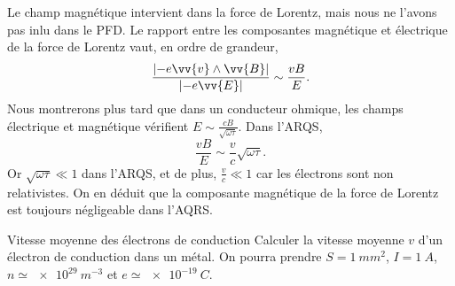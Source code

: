 \documentclass[12pt,fancy]{cours}%
\begin{document}
\label{subsec:effet_B}
Le champ magnétique intervient dans la force de Lorentz, mais nous ne l'avons pas inlu dans le PFD. Le rapport entre les composantes magnétique et électrique de la force de Lorentz vaut, en ordre de grandeur,
 \begin{equation}
 \frac{\norme{-e\vv{v}\pv\vv{B}}}{\norme{-e\vv{E}}}\sim\frac{vB}{E}.
 \end{equation}
Nous montrerons plus tard que dans un conducteur ohmique, les champs électrique et magnétique vérifient  $E\sim \frac{cB}{\sqrt{\omega\tau}}$.
Dans l'ARQS,
 \begin{equation}
   \frac{vB}{E}\sim \frac{v}{c}\sqrt{\omega\tau}.
   \end{equation}
   Or $\sqrt{\omega\tau}\ll 1$ dans l'ARQS, et de plus, $\frac{v}{c}\ll 1$ car les électrons sont non relativistes. On en déduit que la composante magnétique de la force de Lorentz est toujours négligeable dans l'AQRS.
   \begin{exemple}{Vitesse moyenne des électrons de conduction}
    Calculer la vitesse moyenne $v$ d'un électron de conduction dans un métal. On pourra prendre $S=\SI{1}{mm^2}$, $I=\SI{1}{A}$, $n\simeq\SI{e29}{m^{-3}}$ et $e\simeq\SI{e-19}{C}$.
   \end{exemple}
%
%
\end{document}
